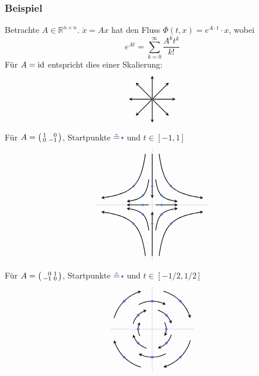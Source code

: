 \subsubsection[Beispiele für dynamische Systeme]{Beispiel} %
\label{ssub:252}
Betrachte $A \in \mathds{R}^{n \times n}$. $\dot x = A x$ hat den Fluss $\Phi(t,x) = e^{A \cdot t} \cdot  x$, wobei
\[
	e^{A t} = \sum_{k=0}^{\infty} \frac{A^k t^k}{k!}  
\]
Für $A= \operatorname{id}$ entspricht dies einer Skalierung:
\[
	\begin{tikzpicture}
		\foreach \x in {0,45,...,315}{
			\draw[arrows={-stealth}, thick] (0,0) -- (\x:1);
		}
		\draw[fill, Tomato3] (0,0) circle (0.03);
	\end{tikzpicture}
\]
Für $A = \begin{psmallmatrix*}[r]
	1 & 0 \\
	0 & -1
\end{psmallmatrix*}$, Startpunkte $\hat{=}\,{\tikz[baseline=-0.5ex]{\draw[fill, RoyalBlue2] (0,0) circle[radius=0.04]}}$ und $t \in [-1, 1]$
\[
	\begin{tikzpicture}[scale=0.8]
		\draw[Gray0] (-3,0) -- (3,0);
		\draw[Gray0] (0,-3) -- (0,3);
		\begin{scope}
		\foreach \x/\y in {1/1, -1/-1, 1/-1, -1/1, 0.5/0.5, -0.5/-0.5, -0.5/0.5, 0.5/-0.5, 0/1, 0/-1, 0.5/0, -0.5/0}{
			\draw[thick, domain=-1:1, smooth, variable=\t, arrows={-stealth}] plot ({exp(\t)*\x},{exp(-\t)*\y});
			\draw[fill, RoyalBlue2] (\x,\y) circle[radius=0.05];
		}
		\end{scope}
	\end{tikzpicture}
\]
Für $A = \begin{psmallmatrix*}[r]
	0 & 1 \\
	-1 & 0
\end{psmallmatrix*}$, Startpunkte $\hat{=}\,{\tikz[baseline=-0.5ex]{\draw[fill, RoyalBlue2] (0,0) circle[radius=0.04]}}$ und $t \in [-1/2, 1/2]$
\[
	\begin{tikzpicture}[scale=1.2]
		\draw[Gray0] (-1.5,0) -- (1.5,0);
		\draw[Gray0] (0,-1.5) -- (0,1.5);
		\begin{scope}
		\foreach \x/\y in {1/1, -1/-1, 1/-1, -1/1, 0.5/0.5, -0.5/-0.5, -0.5/0.5, 0.5/-0.5, 0/1, 0/-1, 0.5/0, -0.5/0}{
			\draw[thick, domain=-0.5:0.5, variable=\t, arrows={-stealth}] 
			plot ({\x*cos(deg(\t))+ \y*sin(deg(\t))},{-\x*sin(deg(\t))+ \y*cos(deg(\t))});
			\draw[fill, RoyalBlue2] (\x,\y) circle[radius=0.04];
		}
		\end{scope}
	\end{tikzpicture}
\]
